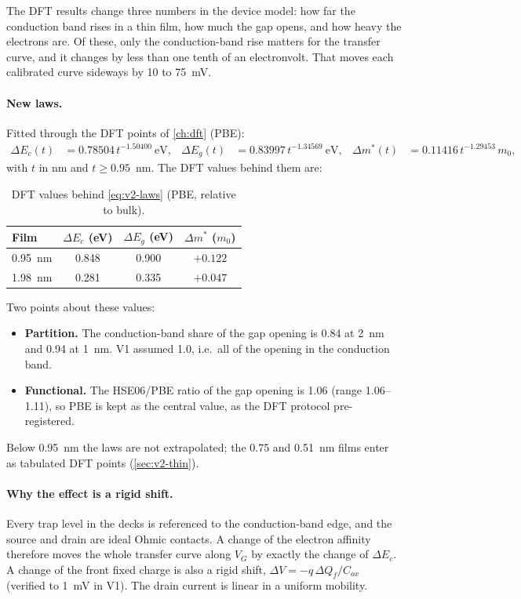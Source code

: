 \begin{v2plain}
The DFT results change three numbers in the device model: how far the conduction band rises in a thin film, how much
the gap opens, and how heavy the electrons are. Of these, only the conduction-band rise matters for the transfer curve,
and it changes by less than one tenth of an electronvolt. That moves each calibrated curve sideways by 10 to 75~mV.
\end{v2plain}

\paragraph{New laws.} Fitted through the DFT points of \cref{ch:dft} (PBE):
\begin{align}
\Delta E_c(t) &= 0.78504\,t^{-1.50400}~\text{eV}, &
\Delta E_g(t) &= 0.83997\,t^{-1.34569}~\text{eV}, &
\Delta m^*(t) &= 0.11416\,t^{-1.29453}\,m_0 ,
\label{eq:v2-laws}
\end{align}
with $t$ in nm and $t\geq0.95$~nm. The DFT values behind them are:

\begin{table}[htbp]\centering\small
\caption{DFT values behind \cref{eq:v2-laws} (PBE, relative to bulk).}\label{tab:v2-dftpoints}
\begin{tabular}{lccc}\toprule
Film & $\Delta E_c$ (eV) & $\Delta E_g$ (eV) & $\Delta m^*$ ($m_0$)\\\midrule
0.95~nm & 0.848 & 0.900 & $+0.122$\\
1.98~nm & 0.281 & 0.335 & $+0.047$\\\bottomrule
\end{tabular}
\end{table}

Two points about these values:
\begin{itemize}
\item \textbf{Partition.} The conduction-band share of the gap opening is 0.84 at 2~nm and 0.94 at 1~nm. V1 assumed
1.0, i.e.\ all of the opening in the conduction band.
\item \textbf{Functional.} The HSE06/PBE ratio of the gap opening is 1.06 (range 1.06--1.11), so PBE is kept as the
central value, as the DFT protocol pre-registered.
\end{itemize}
Below 0.95~nm the laws are not extrapolated; the 0.75 and 0.51~nm films enter as tabulated DFT points (\cref{sec:v2-thin}).

\paragraph{Why the effect is a rigid shift.} Every trap level in the decks is referenced to the conduction-band edge,
and the source and drain are ideal Ohmic contacts. A change of the electron affinity therefore moves the whole
transfer curve along $V_G$ by exactly the change of $\Delta E_c$. A change of the front fixed charge is also a rigid
shift, $\Delta V = -q\,\Delta Q_f/C_{ox}$ (verified to 1~mV in V1). The drain current is linear in a uniform mobility.

